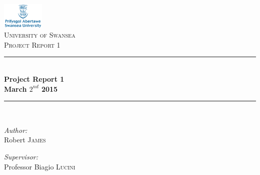 \begin{titlepage}
\begin{center}
\newcommand{\HRule}{\rule{\linewidth}{0.5mm}}
\includegraphics[width=0.15\textwidth]{./SwanseaLogo}~\\[1cm]

\textsc{\LARGE University of Swansea}\\[1.5cm]

\textsc{\Large Project Report 1}\\[0.5cm]

\HRule \\[0.4cm]
{ \huge \bfseries Project Report 1\\ March $2^{nd}$ 2015 \\[0.4cm] }

\HRule \\[1.5cm]

\noindent
\begin{minipage}{0.4\textwidth}
\begin{flushleft} \large
\emph{Author:}\\
Robert \textsc{James}
\end{flushleft}
\end{minipage}%
\begin{minipage}{0.4\textwidth}
\begin{flushright} \large
\emph{Supervisor:} \\
Professor Biagio \textsc{Lucini}
\end{flushright}
\end{minipage}

\vfill


\end{center}

\clearpage

\end{titlepage}
